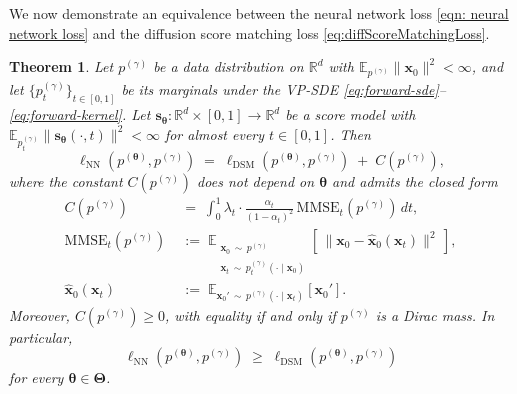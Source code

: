 \documentclass[11pt]{article}
\newcommand{\vect}[1]{\mathbf{#1}}
\theoremstyle{plain}
\newtheorem{theorem}{Theorem}[section]
\newcommand{\1}{\mathbbm{1}}
\newcommand{\btheta}{{\boldsymbol{\theta}}}
\newcommand{\vx}{\vect{x}}
\newcommand{\vs}{\vect{s}}
\newcommand{\ldsm}{\ell_\mathrm{DSM}}
\newcommand{\lnn}{\ell_{\mathrm{NN}}}
\newcommand{\pdist}[2][]{p_{#1}^{(#2)}}
\begin{document}
\begin{appendices}
We now demonstrate an equivalence between the neural network loss \eqref{eqn: neural network loss} and the diffusion score matching loss \eqref{eq:diffScoreMatchingLoss}. 
\begin{theorem}
\label{lem:nn-dsm-ordering}
Let $\pdist{\gamma}$ be a data distribution on $\mathbb{R}^d$ with $\mathbb{E}_{\pdist{\gamma}}\|\vx_0\|^2 < \infty$, and let $\{\pdist[t]{\gamma}\}_{t\in[0,1]}$ be its marginals under the VP-SDE \eqref{eq:forward-sde}--\eqref{eq:forward-kernel}. Let $\vs_\btheta:\mathbb{R}^d \times [0,1] \to \mathbb{R}^d$ be a score model with $\mathbb{E}_{\pdist[t]{\gamma}}\|\vs_\btheta(\cdot,t)\|^2 < \infty$ for almost every $t \in [0,1]$. Then
\begin{equation}
   \lnn(\pdist{\btheta}, \pdist{\gamma}) \;=\; \ldsm(\pdist{\btheta}, \pdist{\gamma}) \;+\; C(\pdist{\gamma}),
   \label{eq:nn-dsm-equivalence}
\end{equation}
where the constant $C(\pdist{\gamma})$ does not depend on $\btheta$ and admits the closed form
\begin{align}   \label{eq:nn-dsm-constant}
   C(\pdist{\gamma}) &\;=\; \int_0^1 \lambda_t \cdot \frac{\alpha_t}{(1-\alpha_t)^2}\,\mathrm{MMSE}_t(\pdist{\gamma})\, dt,\\
\mathrm{MMSE}_t(\pdist{\gamma}) 
&\;:=\; 
\mathbb{E}_{\substack{\vx_0 \,\sim\, \pdist{\gamma} \\ \vx_t \,\sim\, \pdist[t]{\gamma}(\cdot\mid\vx_0)}}\!\left[\,\big\|\vx_0 - \widehat{\vx}_0(\vx_t)\big\|^2\,\right],\\
\widehat{\vx}_0(\vx_t) &\;:=\; \mathbb{E}_{\vx_0' \,\sim\, \pdist{\gamma}(\cdot\mid\vx_t)}[\vx_0'].
\end{align}
Moreover, $C(\pdist{\gamma}) \ge 0$, with equality if and only if $\pdist{\gamma}$ is a Dirac mass. In particular,
\begin{equation}
   \lnn(\pdist{\btheta}, \pdist{\gamma}) \;\ge\; \ldsm(\pdist{\btheta}, \pdist{\gamma})
   \label{eq:nn-dsm-ordering}
\end{equation}
for every $\btheta \in \boldsymbol{\Theta}$.
\end{theorem}



\end{appendices}
\end{document}
